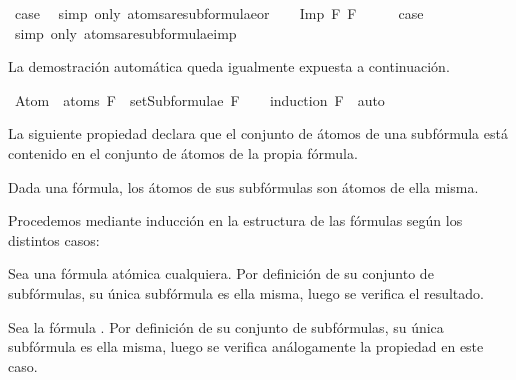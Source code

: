 \begin{isabellebody}
\ {\isacharquery}case\ \isamarkupfalse%
\ {\isacharparenleft}simp\ only{\isacharcolon}\ atoms{\isacharunderscore}are{\isacharunderscore}subformulae{\isacharunderscore}or{\isacharparenright}\isanewline
{}\isamarkupfalse%
\isanewline
\ \ \isamarkupfalse%
\ {\isacharparenleft}Imp\ F{}\ F{}{\isacharparenright}\isanewline
\ \ \isamarkupfalse%
\ \isamarkupfalse%
\ {\isacharquery}case\ \isamarkupfalse%
\ {\isacharparenleft}simp\ only{\isacharcolon}\ atoms{\isacharunderscore}are{\isacharunderscore}subformulae{\isacharunderscore}imp{\isacharparenright}\isanewline
{}\isamarkupfalse%
%
\endisatagproof
{\isafoldproof}%
%
\isadelimproof
%
\endisadelimproof
%
\begin{isamarkuptext}%
La demostración automática queda igualmente expuesta a 
  continuación.%
\end{isamarkuptext}\isamarkuptrue%
\isamarkupfalse%
\ {\isachardoublequoteopen}Atom\ {\isacharbackquote}\ atoms\ F\ {\isasymsubseteq}\ setSubformulae\ F{\isachardoublequoteclose}\isanewline
%
\isadelimproof
\ \ %
\endisadelimproof
%
\isatagproof
{}\isamarkupfalse%
\ {\isacharparenleft}induction\ F{\isacharparenright}\ \ auto%
\endisatagproof
{\isafoldproof}%
%
\isadelimproof
%
\endisadelimproof
%
\begin{isamarkuptext}%
La siguiente propiedad declara que el conjunto de átomos de una 
  subfórmula está contenido en el conjunto de átomos de la propia 
  fórmula.

  \begin{lema}
  Dada una fórmula, los átomos de sus subfórmulas son átomos de ella
  misma.
  \end{lema}

  \begin{demostracion}
  Procedemos mediante inducción en la estructura de las fórmulas según 
  los distintos casos:

  Sea  una fórmula atómica cualquiera. Por definición de su conjunto
  de subfórmulas, su única subfórmula es ella misma, luego se verifica
  el resultado.

  Sea la fórmula \isa{{\isasymbottom}}. Por definición de su conjunto de subfórmulas, su 
  única subfórmula es ella misma, luego se verifica análogamente la
  propiedad en este caso.


\end{demostracion}
\end{isamarkuptext}
\end{isabellebody}

